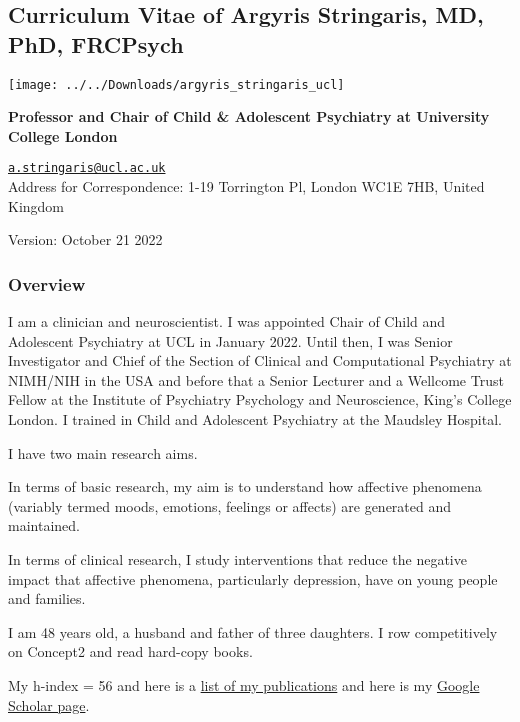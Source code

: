 \documentclass[
]{article}
\author{}
\date{\vspace{-2.5em}}
\begin{document}
\hypertarget{curriculum-vitae-of-argyris-stringaris-md-phd-frcpsych}{%
\subsection{Curriculum Vitae of Argyris Stringaris, MD, PhD,
FRCPsych}\label{curriculum-vitae-of-argyris-stringaris-md-phd-frcpsych}}

\begin{flushright}\texttt{[image: ../../Downloads/argyris\_stringaris\_ucl]} \end{flushright}

\textbf{Professor and Chair of Child \& Adolescent Psychiatry at
University College London}

\href{mailto:a.stringaris@ucl.ac.uk}{\nolinkurl{a.stringaris@ucl.ac.uk}}\\
Address for Correspondence: 1-19 Torrington Pl, London WC1E 7HB, United
Kingdom

Version: October 21 2022

\hypertarget{overview}{%
\subsubsection{Overview}\label{overview}}

I am a clinician and neuroscientist. I was appointed Chair of Child and
Adolescent Psychiatry at UCL in January 2022. Until then, I was Senior
Investigator and Chief of the Section of Clinical and Computational
Psychiatry at NIMH/NIH in the USA and before that a Senior Lecturer and
a Wellcome Trust Fellow at the Institute of Psychiatry Psychology and
Neuroscience, King's College London. I trained in Child and Adolescent
Psychiatry at the Maudsley Hospital.

I have two main research aims.

In terms of basic research, my aim is to understand how affective
phenomena (variably termed moods, emotions, feelings or affects) are
generated and maintained.

In terms of clinical research, I study interventions that reduce the
negative impact that affective phenomena, particularly depression, have
on young people and families.

I am 48 years old, a husband and father of three daughters. I row
competitively on Concept2 and read hard-copy books.

My h-index = 56 and here is a
\href{https://pubmed.ncbi.nlm.nih.gov/?term=stringaris+a\&sort=date}{list
of my publications} and here is my
\href{https://scholar.google.com/citations?user=9B82424AAAAJ\&hl=en\&oi=ao}{Google
Scholar page}.
\end{document}
